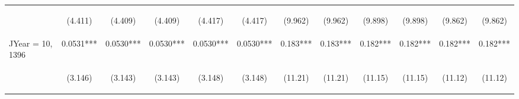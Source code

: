 \documentclass[]{article}
\begin{document}
\begin{center}
\begin{tabular}{lccccccccccc}
\vspace{4pt} & \begin{footnotesize}(4.411)\end{footnotesize} & \begin{footnotesize}(4.409)\end{footnotesize} & \begin{footnotesize}(4.409)\end{footnotesize} & \begin{footnotesize}(4.417)\end{footnotesize} & \begin{footnotesize}(4.417)\end{footnotesize} & \begin{footnotesize}(9.962)\end{footnotesize} & \begin{footnotesize}(9.962)\end{footnotesize} & \begin{footnotesize}(9.898)\end{footnotesize} & \begin{footnotesize}(9.898)\end{footnotesize} & \begin{footnotesize}(9.862)\end{footnotesize} & \begin{footnotesize}(9.862)\end{footnotesize} \\
JYear = 10, 1396 & 0.0531*** & 0.0530*** & 0.0530*** & 0.0530*** & 0.0530*** & 0.183*** & 0.183*** & 0.182*** & 0.182*** & 0.182*** & 0.182*** \\
\vspace{4pt} & \begin{footnotesize}(3.146)\end{footnotesize} & \begin{footnotesize}(3.143)\end{footnotesize} & \begin{footnotesize}(3.143)\end{footnotesize} & \begin{footnotesize}(3.148)\end{footnotesize} & \begin{footnotesize}(3.148)\end{footnotesize} & \begin{footnotesize}(11.21)\end{footnotesize} & \begin{footnotesize}(11.21)\end{footnotesize} & \begin{footnotesize}(11.15)\end{footnotesize} & \begin{footnotesize}(11.15)\end{footnotesize} & \begin{footnotesize}(11.12)\end{footnotesize} & \begin{footnotesize}(11.12)\end{footnotesize} \\

\end{tabular}
\end{center}
\end{document}
